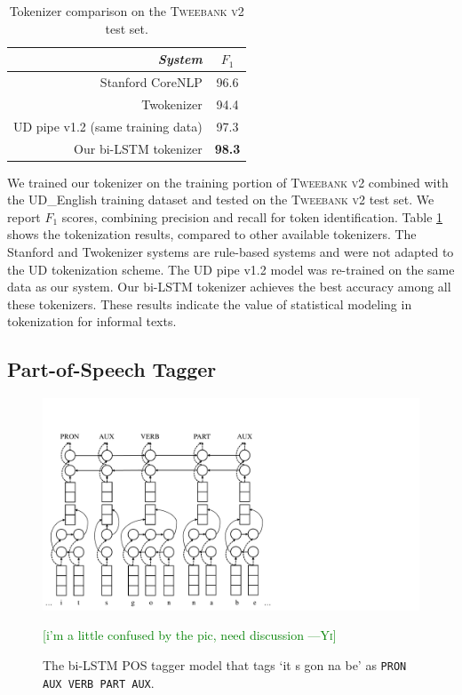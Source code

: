 \documentclass[11pt,a4paper]{article}
\newcommand{\yicomment}[1]{\textcolor{green}{[#1 ---\textsc{Yi}]}}
\begin{document}
\begin{table}[t]
	\centering
	\begin{tabular}{rc}
		\hline
		\it System & $F_1$ \\
		\hline
		Stanford CoreNLP & 96.6 \\
		Twokenizer & 94.4 \\
		UD pipe v1.2 (same training data) & 97.3 \\
		Our bi-LSTM tokenizer & \bf 98.3 \\
		\hline
	\end{tabular}
	\caption{Tokenizer comparison on the \textsc{Tweebank v2} test set.}\label{tbl:tok-result}
\end{table}

We trained our tokenizer on the training portion of
\textsc{Tweebank v2} combined with the UD\_English training dataset
and tested on the \textsc{Tweebank v2} test set. 
We report $F_1$ scores, combining precision and recall for token identification. Table \ref{tbl:tok-result} shows the
tokenization results, compared to  other available tokenizers. 
The Stanford \cite{manning-EtAl:2014:P14-5} and Twokenizer
\cite{ICWSM101540} systems are rule-based systems and were not adapted
to the UD tokenization scheme.
The UD pipe v1.2
\cite{straka-strakova:2017:K17-3} model was re-trained on the same
data as our system.
Our bi-LSTM tokenizer achieves the best accuracy among all these
tokenizers.  These results indicate the value of statistical modeling
in tokenization for informal texts.

\subsection{Part-of-Speech Tagger}

\begin{figure}[t]
	\centering
	\includegraphics[width=\columnwidth,trim={0 0 13cm 3cm},clip]{graphics/bilstm_postagger}
	\caption{The bi-LSTM POS tagger model that tags `it s gon na be' as {\tt PRON AUX VERB PART AUX}.}\label{fig:pos-model}
	\yicomment{i'm a little confused by the pic, need discussion}
\end{figure}
\end{document}
